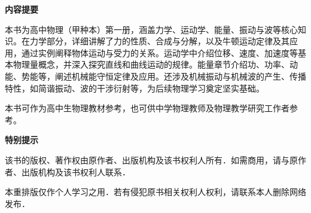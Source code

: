 
\begin{center}
  \begin{minipage}{12cm}\vspace{3cm}
    \label{abstract}
    \begin{center}\bfseries{内\quad 容\quad 提\quad 要}\end{center}
    \hspace{2em}本书为高中物理（甲种本）第一册，涵盖力学、运动学、能量、振动与波等核心知识。在力学部分，详细讲解了力的性质、合成与分解，以及牛顿运动定律及其应用，通过实例阐释物体运动与受力的关系。运动学中介绍位移、速度、加速度等基本物理量概念，并深入探究直线和曲线运动的规律。能量章节介绍功、功率、动能、势能等，阐述机械能守恒定律及应用。还涉及机械振动与机械波的产生、传播特性，如简谐振动、波的干涉衍射等，为后续物理学习奠定坚实基础。

    \hspace{2em}本书可作为高中生物理教材参考，也可供中学物理教师及物理教学研究工作者参考。
  \end{minipage}
\end{center}
\thispagestyle{empty}
\clearpage
\begin{center}
	\begin{minipage}{12cm}\vspace{3cm}
		\label{tips}
		\begin{center}\bfseries{特\quad 别\quad 提\quad 示}\end{center}
		\hspace{2em}该书的版权、著作权由原作者、出版机构及该书权利人所有．如需商用，请与原作者、出版机构及该书权利人联系．
		
		\hspace{2em}本重排版仅作个人学习之用．若有侵犯原书相关权利人权利，请联系本人删除网络发布．
		
	\end{minipage}
\end{center}
\thispagestyle{empty}
\clearpage